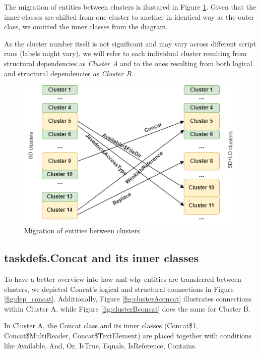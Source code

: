 \documentclass[conference]{IEEEtran}
\begin{document}
The migration of entities between clusters is ilustared in Figure \ref{fig:clustersmigration}. Given that the inner classes are shifted from one cluster to another in identical way as the outer class, we omitted the inner classes from the diagram.

As the cluster number itself is not significant and may vary across different script runs (labels might vary), we will refer to each individual cluster resulting from structural dependencies as \textit{Cluster A} and to the ones resulting from both logical and structural dependencies as \textit{Cluster B}.

\begin{figure}
\centering
\includegraphics[width=\columnwidth]{clusters.png}
\caption{Migration of entities between clusters}
\label{fig:clustersmigration}
\centering
\end{figure}

\subsection{taskdefs.Concat and its inner classes}

To  have a better overview into how and why entities are transferred between clusters, we depicted Concat's logical and structural connections in Figure \ref{fig:dep_concat}. Additionally, Figure \ref{fig:clusterAconcat} illustrates connections within Cluster A, while Figure \ref{fig:clusterBconcat} does the same for Cluster B.

In Cluster A, the Concat class and its inner classes (Concat\$1, Concat\$MultiReader, Concat\$TextElement) are placed together with conditions like Available, And, Or, IsTrue, Equals, IsReference, Contains.
\end{document}
